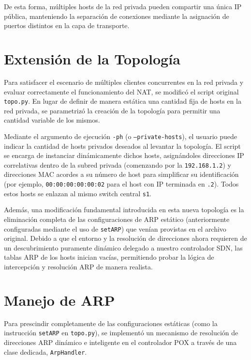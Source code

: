 \documentclass[11pt, a4paper]{article}
\begin{document}
De esta forma, múltiples hosts de la red privada pueden compartir una única IP pública, manteniendo la separación de conexiones mediante la asignación de puertos distintos en la capa de transporte.


\section{Extensión de la Topología}
\label{sec:extension_topologia}

Para satisfacer el escenario de múltiples clientes concurrentes en la red privada y evaluar correctamente el funcionamiento del NAT, se modificó el script original \texttt{topo.py}. En lugar de definir de manera estática una cantidad fija de hosts en la red privada, se parametrizó la creación de la topología para permitir una cantidad variable de los mismos.

Mediante el argumento de ejecución \texttt{-ph} (o \texttt{--private-hosts}), el usuario puede indicar la cantidad de hosts privados deseados al levantar la topología. El script se encarga de instanciar dinámicamente dichos hosts, asignándoles direcciones IP correlativas dentro de la subred privada (comenzando por la \texttt{192.168.1.2}) y direcciones MAC acordes a su número de host para simplificar su identificación (por ejemplo, \texttt{00:00:00:00:00:02} para el host con IP terminada en \texttt{.2}). Todos estos hosts se enlazan al mismo switch central \texttt{s1}.

Además, una modificación fundamental introducida en esta nueva topología es la eliminación completa de las configuraciones de ARP estático (anteriormente configuradas mediante el uso de \texttt{setARP}) que venían provistas en el archivo original. Debido a que el entorno y la resolución de direcciones ahora requieren de un descubrimiento puramente dinámico delegado a nuestro controlador SDN, las tablas ARP de los hosts inician vacías, permitiendo probar la lógica de intercepción y resolución ARP de manera realista.


\section{Manejo de ARP}
\label{sec:manejo_arp}

Para prescindir completamente de las configuraciones estáticas (como la instrucción \texttt{setARP} en \texttt{topo.py}), se implementó un mecanismo de resolución de direcciones ARP dinámico e inteligente en el controlador POX a través de una clase dedicada, \texttt{ArpHandler}.
\end{document}
